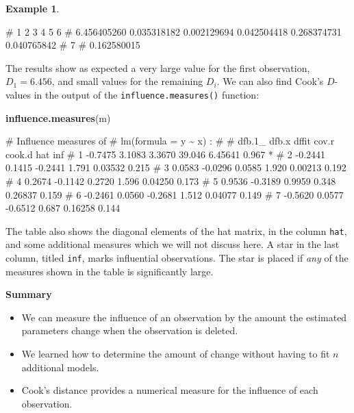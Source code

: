 \documentclass[
  a4paper,
]{article}
\newenvironment{Shaded}{\begin{snugshade}}{\end{snugshade}}
\newcommand{\FunctionTok}[1]{\textcolor[rgb]{0.13,0.29,0.53}{\textbf{#1}}}
\newcommand{\NormalTok}[1]{#1}
\providecommand{\tightlist}{%
  \setlength{\itemsep}{0pt}\setlength{\parskip}{0pt}}
\theoremstyle{definition}
\theoremstyle{definition}
\newtheorem{example}{Example}[section]
\theoremstyle{definition}
\theoremstyle{definition}
\theoremstyle{remark}
\begin{document}
\begin{example}
\begin{Shaded}
\begin{Highlighting}[]
\NormalTok{\#           1           2           3           4           5           6 }
\NormalTok{\# 6.456405260 0.035318182 0.002129694 0.042504418 0.268374731 0.040765842 }
\NormalTok{\#           7 }
\NormalTok{\# 0.162580015}
\end{Highlighting}
\end{Shaded}

The results show as expected a very large value for the first observation,
\(D_1 = 6.456\), and small values for the remaining \(D_i\).
We can also find Cook's \(D\)-values in the output of the
\texttt{influence.measures()} function:

\begin{Shaded}
\begin{Highlighting}[]
\FunctionTok{influence.measures}\NormalTok{(m)}
\end{Highlighting}
\end{Shaded}

\begin{Shaded}
\begin{Highlighting}[]
\NormalTok{\# Influence measures of}
\NormalTok{\#    lm(formula = y \textasciitilde{} x) :}
\NormalTok{\# }
\NormalTok{\#    dfb.1\_   dfb.x   dffit  cov.r  cook.d   hat inf}
\NormalTok{\# 1 {-}0.7475  3.1083  3.3670 39.046 6.45641 0.967   *}
\NormalTok{\# 2 {-}0.2441  0.1415 {-}0.2441  1.791 0.03532 0.215    }
\NormalTok{\# 3  0.0583 {-}0.0296  0.0585  1.920 0.00213 0.192    }
\NormalTok{\# 4  0.2674 {-}0.1142  0.2720  1.596 0.04250 0.173    }
\NormalTok{\# 5  0.9536 {-}0.3189  0.9959  0.348 0.26837 0.159    }
\NormalTok{\# 6 {-}0.2461  0.0560 {-}0.2681  1.512 0.04077 0.149    }
\NormalTok{\# 7 {-}0.5620  0.0577 {-}0.6512  0.687 0.16258 0.144}
\end{Highlighting}
\end{Shaded}

The table also shows the diagonal elements of the hat matrix, in the
column \texttt{hat}, and some additional measures which we will not discuss here.
A star in the last column, titled \texttt{inf}, marks influential observations.
The star is placed if \emph{any} of the measures shown in the table is significantly
large.
\end{example}

\textbf{Summary}

\begin{itemize}
\tightlist
\item
  We can measure the influence of an observation by the amount
  the estimated parameters change when the observation is deleted.
\item
  We learned how to determine the amount of change without
  having to fit \(n\) additional models.
\item
  Cook's distance provides a numerical measure for the influence of each
  observation.
\end{itemize}
\end{document}
